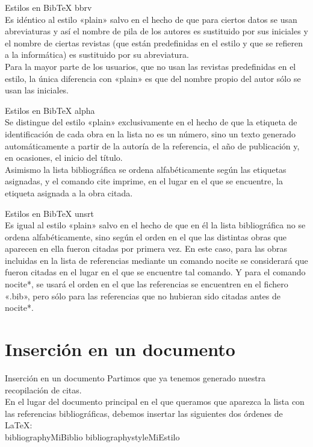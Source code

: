 \documentclass[9pt]{beamer}
\begin{document}
\begin{frame}{Estilos en BibTeX}
bbrv \\
Es idéntico al estilo «plain» salvo en el hecho de que para ciertos datos se usan abreviaturas y así el nombre de pila de los autores es sustituido por sus iniciales y el nombre de ciertas revistas (que están predefinidas en el estilo y que se refieren a la informática) es sustituido por su abreviatura.\\
Para la mayor parte de los usuarios, que no usan las revistas predefinidas en el estilo, la única diferencia con «plain» es que del nombre propio del autor sólo se usan las iniciales.\\
\end{frame}

\begin{frame}{Estilos en BibTeX}
alpha \\
Se distingue del estilo «plain» exclusivamente en el hecho de que la etiqueta de identificación de cada obra en la lista no es un número, sino un texto generado automáticamente a partir de la autoría de la referencia, el año de publicación y, en ocasiones, el inicio del título.\\
Asimismo la lista bibliográfica se ordena alfabéticamente según las etiquetas asignadas, y el comando cite imprime, en el lugar en el que se encuentre, la etiqueta asignada a la obra citada.\\
\end{frame}

\begin{frame}{Estilos en BibTeX}
unsrt \\
Es igual al estilo «plain» salvo en el hecho de que en él la lista bibliográfica no se ordena alfabéticamente, sino según el orden en el que las distintas obras que aparecen en ella fueron citadas por primera vez.
En este caso, para las obras incluidas en la lista de referencias mediante un comando nocite se considerará que fueron citadas en el lugar en el que se encuentre tal comando. Y para el comando nocite{*}, se usará el orden en el que las referencias se encuentren en el fichero «.bib», pero sólo para las referencias que no hubieran sido citadas antes de nocite{*}.

\end{frame}

\section{Inserción en un documento}
\begin{frame}{Inserción en un documento}
Partimos que ya tenemos generado nuestra recopilación de citas.\\
En el lugar del documento principal en el que queramos que aparezca la lista con las referencias bibliográficas, debemos insertar las siguientes dos órdenes de LaTeX:\\
bibliography{MiBiblio}
bibliographystyle{MiEstilo}

\end{frame}
\end{document}
